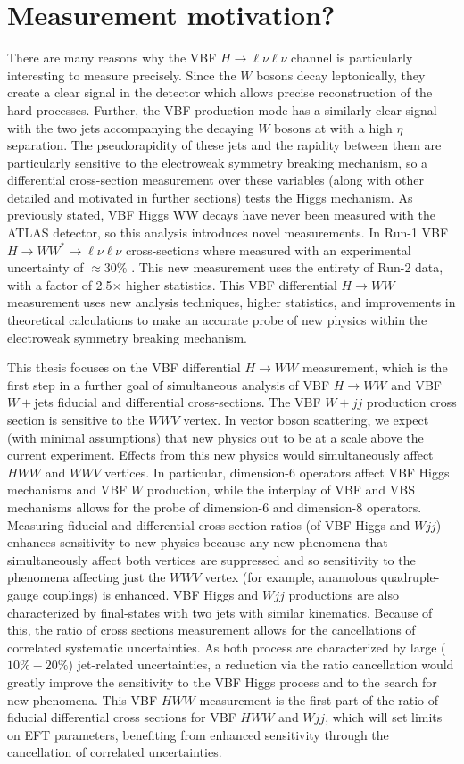 \section{Measurement motivation?}
There are many reasons why the VBF $H\rightarrow\ell\nu\ell\nu$ channel is particularly interesting to measure precisely. Since the $W$ bosons decay leptonically, they create a clear signal in the detector which allows precise reconstruction of the hard processes. Further, the VBF production mode has a similarly clear signal with the two jets accompanying the decaying $W$ bosons at with a high $\eta$ separation. The pseudorapidity of these jets and the rapidity between them are particularly sensitive to the electroweak symmetry breaking mechanism, so a differential cross-section measurement over these variables (along with other detailed and motivated in further sections) tests the Higgs mechanism. As previously stated, VBF Higgs WW decays have never been measured with the ATLAS detector, so this analysis introduces novel measurements. In Run-1 VBF $H\rightarrow WW^* \rightarrow \ell\nu\ell\nu$ cross-sections where measured with an experimental uncertainty of $\approx30\%$ \cite{HiggsCurrent}. This new measurement uses the entirety of Run-2 data, with a factor of 2.5$\times$ higher statistics. This VBF differential $H\rightarrow WW$ measurement uses new analysis techniques, higher statistics, and improvements in theoretical calculations to make an accurate probe of new physics within the electroweak symmetry breaking mechanism.

This thesis focuses on the VBF differential $H\rightarrow WW$ measurement, which is the first step in a further goal of simultaneous analysis of VBF $H\rightarrow WW$ and VBF $W+$jets fiducial and differential cross-sections. The VBF $W+jj$ production cross section is sensitive to the $WWV$ vertex. In vector boson scattering, we expect (with minimal assumptions) that new physics out to be at a scale above the current experiment. Effects from this new physics would simultaneously affect $HWW$ and $WWV$ vertices. In particular, dimension-6 operators affect VBF Higgs mechanisms and VBF $W$ production, while the interplay of VBF and VBS mechanisms allows for the probe of dimension-6 and dimension-8 operators. Measuring fiducial and differential cross-section ratios (of VBF Higgs and $Wjj$) enhances sensitivity to new physics because any new phenomena that simultaneously affect both vertices are suppressed and so sensitivity to the phenomena affecting just the $WWV$ vertex (for example, anamolous quadruple-gauge couplings) is enhanced.  VBF Higgs and $Wjj$ productions are also characterized by final-states with two jets with similar kinematics. Because of this, the ratio of cross sections measurement allows for the cancellations of correlated systematic uncertainties. As both process are characterized by large ($10\%-20\%$) jet-related uncertainties, a reduction via the ratio cancellation would greatly improve the sensitivity to the VBF Higgs process and to the search for new phenomena. This VBF $HWW$ measurement is the first part of the ratio of fiducial differential cross sections for VBF $HWW$ and $Wjj$, which will set limits on EFT parameters, benefiting from enhanced sensitivity through the cancellation of correlated uncertainties. 

